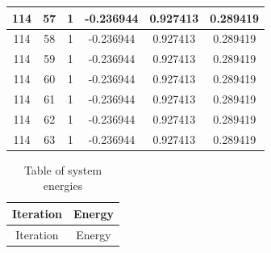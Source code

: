 \documentclass[12pt,a4paper]{article}
\numberwithin{equation}{section}
\numberwithin{figure}{section}
\numberwithin{table}{section}
\begin{document}
\begin{longtable}{|c|c|c|c|c|c|}
114 & 57 & 1 & -0.236944 & 0.927413 & 0.289419 \\ \hline
114 & 58 & 1 & -0.236944 & 0.927413 & 0.289419 \\ \hline
114 & 59 & 1 & -0.236944 & 0.927413 & 0.289419 \\ \hline
114 & 60 & 1 & -0.236944 & 0.927413 & 0.289419 \\ \hline
114 & 61 & 1 & -0.236944 & 0.927413 & 0.289419 \\ \hline
114 & 62 & 1 & -0.236944 & 0.927413 & 0.289419 \\ \hline
114 & 63 & 1 & -0.236944 & 0.927413 & 0.289419 \\ \hline
	\end{longtable}
	
	\clearpage
	
	\begin{longtable}{|c|c|}
		\caption{Table of system energies}
		\label{tab:energy}\\
		\hline
		Iteration & Energy\\
		\hline
		\endfirsthead
		
		\hline
		Iteration & Energy\\
		\hline
		\endhead
		

\end{longtable}
\end{document}
